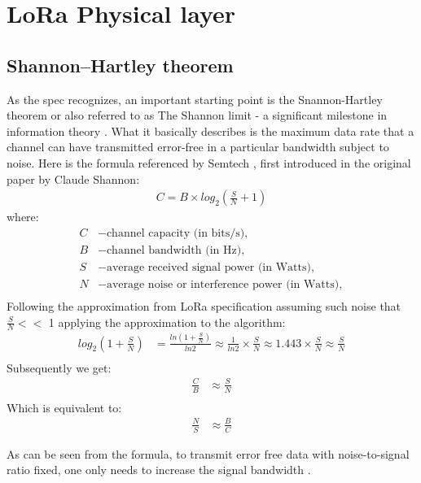 \section{LoRa Physical layer}

\subsection{Shannon–Hartley theorem}

As the spec recognizes, an important starting point is the Snannon-Hartley theorem or also referred to as The Shannon limit - a significant milestone in information theory \cite{mit_article_on_shannon} . What it basically describes is the maximum data rate that a channel can have transmitted error-free in a particular bandwidth subject to noise. Here is the formula referenced by Semtech \cite{semtech_spec}, first introduced in the original paper \cite{shannon} by Claude Shannon:
\begin{align}
    C = B \times log_2 (\frac{S}{N} + 1) \label{eq:shannon}
\end{align}
where:
\begin{align*}
    C &- \text{channel capacity (in bits/s)}, \\
    B &- \text{channel bandwidth (in Hz)},\\
    S &- \text{average received signal power (in Watts)},\\
    N &- \text{average noise or interference power (in Watts)},\\ 
\end{align*}
Following the approximation from LoRa specification \cite{semtech_spec} assuming such noise that $\frac{S}{N} <<$ 1 applying the approximation to the algorithm:
\begin{align}
    log_2(1 + \frac{S}{N}) &= \frac{ln(1+ \frac{S}{N})}{ln2} \approx \frac{1}{ln2}\times \frac{S}{N} \approx 1.443 \times \frac{S}{N} \approx \frac{S}{N} \\
\end{align}
Subsequently we get:
\begin{align}
    \frac{C}{B}& \approx \frac{S}{N} \\
\end{align}
Which is equivalent to:
\begin{align}
    \frac{N}{S} & \approx \frac{B}{C}
\end{align}



As can be seen from the formula, to transmit error free data with noise-to-signal ratio fixed, one only needs to increase the signal bandwidth \cite{semtech_spec}.

